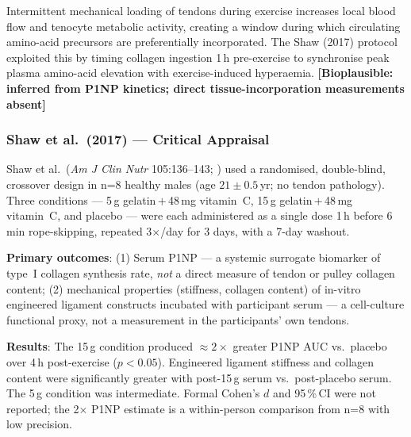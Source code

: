 Intermittent mechanical loading of tendons during exercise increases local blood flow and tenocyte metabolic activity, creating a window during which circulating amino-acid precursors are preferentially incorporated. The Shaw (2017) protocol exploited this by timing collagen ingestion 1\,h pre-exercise to synchronise peak plasma amino-acid elevation with exercise-induced hyperaemia. \textbf{[Bioplausible: inferred from P1NP kinetics; direct tissue-incorporation measurements absent]}

\subsubsection{Shaw et al.\ (2017) --- Critical Appraisal}

Shaw et al.\ (\textit{Am J Clin Nutr} 105:136--143; \cite{SLRE17}) used a randomised, double-blind, crossover design in n=8 healthy males (age $21{\pm}0.5$\,yr; no tendon pathology). Three conditions --- 5\,g gelatin\,$+$\,48\,mg vitamin~C, 15\,g gelatin\,$+$\,48\,mg vitamin~C, and placebo --- were each administered as a single dose 1\,h before 6\,min rope-skipping, repeated 3$\times$/day for 3 days, with a 7-day washout.

\textbf{Primary outcomes}: (1) Serum P1NP --- a systemic surrogate biomarker of type~I collagen synthesis rate, \textit{not} a direct measure of tendon or pulley collagen content; (2) mechanical properties (stiffness, collagen content) of in-vitro engineered ligament constructs incubated with participant serum --- a cell-culture functional proxy, not a measurement in the participants' own tendons.

\textbf{Results}: The 15\,g condition produced ${\approx}2{\times}$ greater P1NP AUC vs.\ placebo over 4\,h post-exercise ($p{<}0.05$). Engineered ligament stiffness and collagen content were significantly greater with post-15\,g serum vs.\ post-placebo serum. The 5\,g condition was intermediate. Formal Cohen's $d$ and 95\,\%\,CI were not reported; the 2$\times$ P1NP estimate is a within-person comparison from n=8 with low precision.

